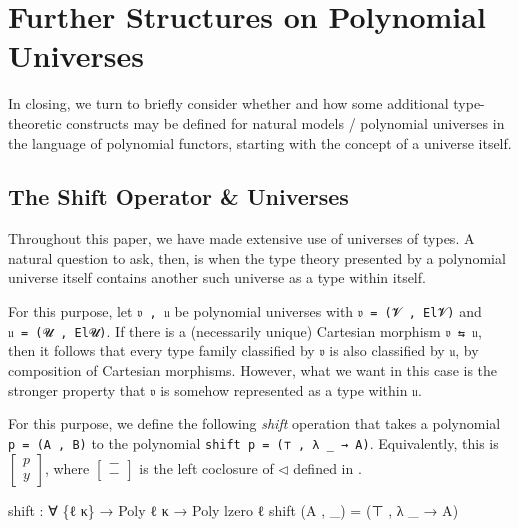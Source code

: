 \documentclass[
  11pt,
  oneside,
  article]{memoir}
\newenvironment{Shaded}{}{}
\newcommand{\NormalTok}[1]{#1}
\newcommand{\OtherTok}[1]{\textcolor[rgb]{0.00,0.44,0.13}{#1}}
\theoremstyle{definition}
\theoremstyle{plain}
\newcommand{\0}{\textsf{0}}
\newcommand{\1}{\tn{\textsf{1}}}
\begin{document}
\chapter{Further Structures on Polynomial
Universes}\label{further-structures-on-polynomial-universes}

In closing, we turn to briefly consider whether and how some additional
type-theoretic constructs may be defined for natural models / polynomial
universes in the language of polynomial functors, starting with the
concept of a universe itself.

\section{The Shift Operator \&
Universes}\label{the-shift-operator-universes}

Throughout this paper, we have made extensive use of universes of types.
A natural question to ask, then, is when the type theory presented by a
polynomial universe itself contains another such universe as a type
within itself.

For this purpose, let \texttt{𝔳\ ,\ 𝔲} be polynomial universes with
\texttt{𝔳\ =\ (𝓥\ ,\ El𝓥)} and \texttt{𝔲\ =\ (𝓤\ ,\ El𝓤)}. If there is a
(necessarily unique) Cartesian morphism \texttt{𝔳\ ⇆\ 𝔲}, then it
follows that every type family classified by \texttt{𝔳} is also
classified by \texttt{𝔲}, by composition of Cartesian morphisms.
However, what we want in this case is the stronger property that
\texttt{𝔳} is somehow represented as a type within \texttt{𝔲}.

For this purpose, we define the following \emph{shift} operation that
takes a polynomial \texttt{p\ =\ (A\ ,\ B)} to the polynomial
\texttt{shift\ p\ =\ (⊤\ ,\ λ\ \_\ →\ A)}. Equivalently, this is
\(\left[ \begin{array}{c} p\\ y \end{array} \right]\), where
\(\left[ \begin{array}{c} -\\ - \end{array} \right]\) is the left
coclosure of \(\triangleleft\) defined in \cite{spivak2022poly}.

\begin{Shaded}
\begin{Highlighting}[]
\NormalTok{shift }\OtherTok{:} \OtherTok{∀} \OtherTok{\{}\NormalTok{ℓ κ}\OtherTok{\}} \OtherTok{→}\NormalTok{ Poly ℓ κ }\OtherTok{→}\NormalTok{ Poly lzero ℓ}
\NormalTok{shift }\OtherTok{(}\NormalTok{A , }\OtherTok{\_)} \OtherTok{=} \OtherTok{(}\NormalTok{⊤ , }\OtherTok{λ} \OtherTok{\_} \OtherTok{→}\NormalTok{ A}\OtherTok{)}
\end{Highlighting}
\end{Shaded}
\end{document}
